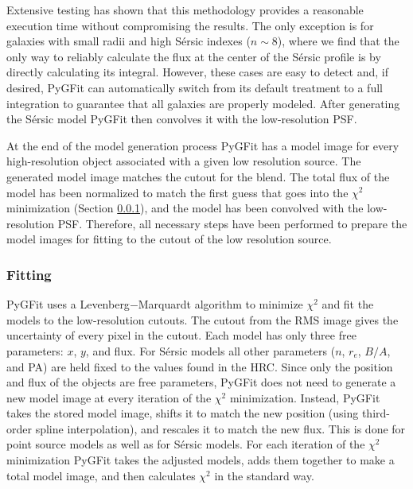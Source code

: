 \documentclass[apj]{emulateapj}
\newcommand{\sersic}{S\'{e}rsic}
\newcommand{\galfit}{GALFIT}
\newcommand{\pygfit}{PyGFit}
\begin{document}
Extensive testing has shown that this methodology provides a reasonable execution time without compromising the results.  The only exception is for galaxies with small radii and high \sersic{} indexes ($n \sim 8$), where we find that the only way to reliably calculate the flux at the center of the \sersic{} profile is by directly calculating its integral.  However, these cases are easy to detect and, if desired, \pygfit{} can automatically switch from its default treatment to a full integration to guarantee that all galaxies are properly modeled.  After generating the \sersic{} model \pygfit{} then convolves it with the low-resolution PSF.

\begin{figure*}
\caption{Original images (top row) and residuals (bottom row) from our \galfit{} and \pygfit{} runs in the core of a high redshift ($z=1.243$) galaxy cluster.  From left to right the images correspond to WFC3/F160W, R, H, and $4.5\mu$m.  The WFC3/F160W image was fit with \galfit{}, while all other bands were fit with \pygfit{}.  All panels show the same field of view, and the scale in the top left panel is 10$^{\prime\prime}$ long.}\label{fig:residuals}
\end{figure*}

At the end of the model generation process \pygfit{} has a model image for every high-resolution object associated with a given low resolution source.  The generated model image matches the cutout for the blend.  The total flux of the model has been normalized to match the first guess that goes into the $\chi^2$ minimization (Section \ref{sec:fitting}), and the model has been convolved with the low-resolution PSF.  Therefore, all necessary steps have been performed to prepare the model images for fitting to the cutout of the low resolution source.

\subsubsection{Fitting}\label{sec:fitting}

\pygfit{} uses a Levenberg$-$Marquardt algorithm to minimize $\chi^2$ and fit the models to the low-resolution cutouts.  The cutout from the RMS image gives the uncertainty of every pixel in the cutout.  Each model has only three free parameters: $x$, $y$, and flux.  For \sersic{} models all other parameters ($n$, $r_e$, $B/A$, and PA) are held fixed to the values found in the HRC.  Since only the position and flux of the objects are free parameters, \pygfit{} does not need to generate a new model image at every iteration of the $\chi^2$ minimization.  Instead, \pygfit{} takes the stored model image, shifts it to match the new position (using third-order spline interpolation), and rescales it to match the new flux.  This is done for point source models as well as for \sersic{} models.  For each iteration of the $\chi^2$ minimization \pygfit{} takes the adjusted models, adds them together to make a total model image, and then calculates $\chi^2$ in the standard way.
\end{document}
